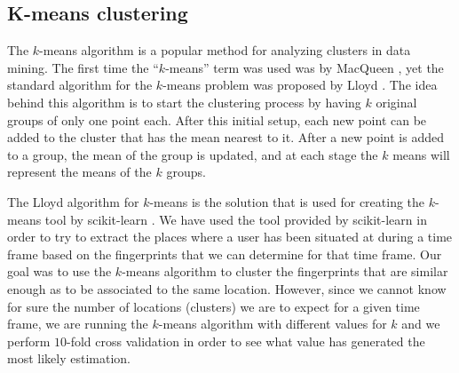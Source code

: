 \subsection{K-means clustering}
\label{k-means}

The $k$-means algorithm is a popular method for analyzing clusters in data
mining. The first time the ``$k$-means'' term was used was by MacQueen
\cite{Macqueen67somemethods}, yet the standard algorithm for the $k$-means
problem was proposed by Lloyd \cite{Lloyd:2006:LSQ:2263356.2269955}. The idea
behind this algorithm is to start the clustering process by having $k$ original
groups of only one point each. After this initial setup, each new point can be
added to the cluster that has the mean nearest to it. After a new point is added
to a group, the mean of the group is updated, and at each stage the $k$ means
will represent the means of the $k$ groups.

The Lloyd algorithm for $k$-means is the solution that is used for creating the
$k$-means tool by scikit-learn \cite{Scikit}. We have used the tool provided by
scikit-learn in order to try to extract the places where a user has been
situated at during a time frame based on the fingerprints that we can determine
for that time frame. Our goal was to use the $k$-means algorithm to cluster the
fingerprints that are similar enough as to be associated to the same location.
However, since we cannot know for sure the number of locations (clusters) we are
to expect for a given time frame, we are running the $k$-means algorithm with
different values for $k$ and we perform $10$-fold cross validation in order to
see what value has generated the most likely estimation.

